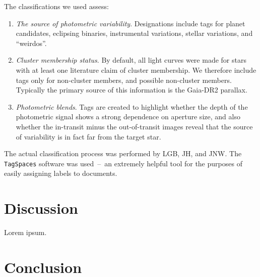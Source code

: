 \documentclass[12pt,twocolumn,tighten]{aastex62}
\begin{document}
The classifications we used assess:
\begin{enumerate}
    \item {\it The source of photometric variability}. Designations include 
    tags for planet candidates, eclipsing binaries, instrumental variations, 
    stellar variations, and ``weirdos''.
    \item {\it Cluster membership status}. By default, all light curves were 
    made for stars with at least one literature claim of cluster membership.  
    We therefore include tags only for non-cluster members, and possible 
    non-cluster members. Typically the primary source of this information is 
    the Gaia-DR2 parallax.
    \item {\it Photometric blends}. Tags are created to highlight whether the 
    depth of the photometric signal shows a strong dependence on aperture 
    size, and also whether the in-transit minus the out-of-transit images 
    reveal that the source of variability is in fact far from the target star.
\end{enumerate}
The actual classification process was performed by LGB, JH, and JNW.
The \texttt{TagSpaces} software was used~--~an extremely helpful tool for the 
purposes of easily assigning labels to documents.






\section{Discussion}
\label{sec:discussion}

Lorem ipsum.

\section{Conclusion}
\label{sec:conclusion}

\end{document}

